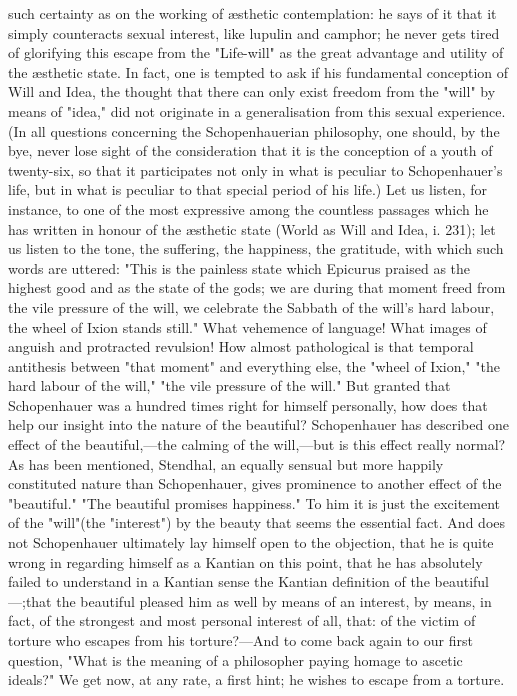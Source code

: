 \documentclass[12pt]{article}
\begin{document}
such certainty as on the working of æsthetic contemplation: he says of it that it simply counteracts sexual interest, like lupulin and camphor; he never gets tired of glorifying this escape from the "Life-will" as the great advantage and utility of the æsthetic state. In fact, one is tempted to ask if his fundamental conception of Will and Idea, the thought that there can only exist freedom from the "will" by means of "idea," did not originate in a generalisation from this sexual experience. (In all questions concerning the Schopenhauerian philosophy, one should, by the bye, never lose sight of the consideration that it is the conception of a youth of twenty-six, so that it participates not only in what is peculiar to Schopenhauer's life, but in what is peculiar to that special period of his life.) Let us listen, for instance, to one of the most expressive among the countless passages which he has written in honour of the æsthetic state (World as Will and Idea, i. 231); let us listen to the tone, the suffering, the happiness, the gratitude, with which such words are uttered: "This is the painless state which Epicurus praised as the highest good and as the state of the gods; we are during that moment freed from the vile pressure of the will, we celebrate the Sabbath of the will's hard labour, the wheel of Ixion stands still." What vehemence of language! What images of anguish and protracted revulsion! How almost pathological is that temporal antithesis between "that moment" and everything else, the "wheel of Ixion," "the hard labour of the will," "the vile pressure of the will." But granted that Schopenhauer was a hundred times right for himself personally, how does that help our insight into the nature of the beautiful? Schopenhauer has described one effect of the beautiful,---the calming of the will,---but is this effect really normal? As has been mentioned, Stendhal, an equally sensual but more happily constituted nature than Schopenhauer, gives prominence to another effect of the "beautiful." "The beautiful promises happiness." To him it is just the excitement of the "will"(the "interest") by the beauty that seems the essential fact. And does not Schopenhauer ultimately lay himself open to the objection, that he is quite wrong in regarding himself as a Kantian on this point, that he has absolutely failed to understand in a Kantian sense the Kantian definition of the beautiful---;that the beautiful pleased him as well by means of an interest, by means, in fact, of the strongest and most personal interest of all, that: of the victim of torture who escapes from his torture?---And to come back again to our first question, "What is the meaning of a philosopher paying homage to ascetic ideals?" We get now, at any rate, a first hint; he wishes to escape from a torture.
\end{document}
